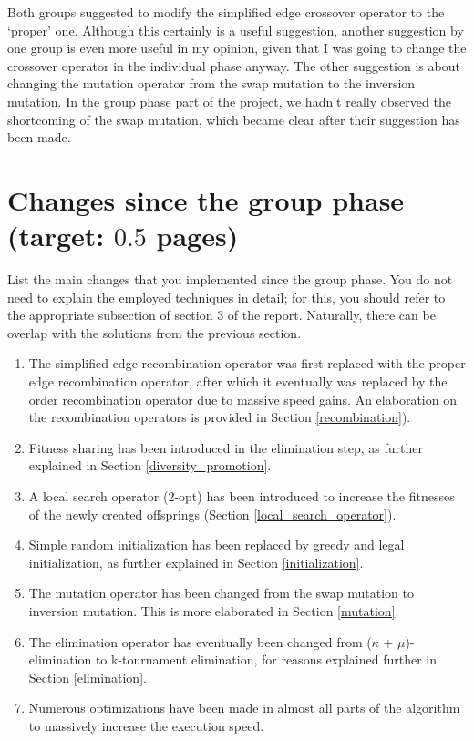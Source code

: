 \documentclass[a4paper,10pt]{article}
\newcommand{\ReplaceMe}[1]{{\color{blue}#1}}
\begin{document}
Both groups suggested to modify the simplified edge crossover operator to the `proper' one. Although this certainly is a useful suggestion, another suggestion by one group is even more useful in my opinion, given that I was going to change the crossover operator in the individual phase anyway. The other suggestion is about changing the mutation operator from the swap mutation to the inversion mutation. In the group phase part of the project, we hadn't really observed the shortcoming of the swap mutation, which became clear after their suggestion has been made.

\section{Changes since the group phase (target: $0.5$ pages)} 

\ReplaceMe{List the main changes that you implemented since the group phase. You do not need to explain the employed techniques in detail; for this, you should refer to the appropriate subsection of section 3 of the report. Naturally, there can be overlap with the solutions from the previous section.}

\begin{enumerate}
\item The simplified edge recombination operator was first replaced with the proper edge recombination operator, after which it eventually was replaced by the order recombination operator due to massive speed gains. An elaboration on the recombination operators is provided in Section \ref{recombination}). 
\item Fitness sharing has been introduced in the elimination step, as further explained in Section \ref{diversity_promotion}.
\item A local search operator (2-opt) has been introduced to increase the fitnesses of the newly created offsprings (Section \ref{local_search_operator}).
\item Simple random initialization has been replaced by greedy and legal initialization, as further explained in Section \ref{initialization}.
\item The mutation operator has been changed from the swap mutation to inversion mutation. This is more elaborated in Section \ref{mutation}.
\item The elimination operator has eventually been changed from ($\kappa$ + $\mu$)-elimination to k-tournament elimination, for reasons explained further in Section \ref{elimination}.
\item Numerous optimizations have been made in almost all parts of the algorithm to massively increase the execution speed.
\end{enumerate}
\end{document}
